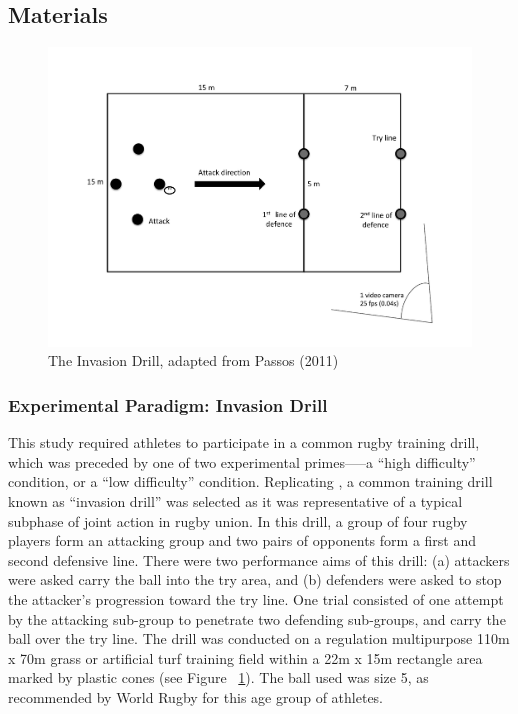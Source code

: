 \subsection{Materials}


\begin{figure}[htbp]
  \centering
      \includegraphics[width = \linewidth]{images/invasionDrill}
      \caption{The Invasion Drill, adapted from Passos (2011)}
      \label{fig:invasionDrill}
  \end{figure}


\subsubsection{Experimental Paradigm: Invasion Drill}
This study required athletes to participate in a common rugby training drill, which was preceded by one of two experimental primes—--a ``high difficulty'' condition, or a ``low difficulty'' condition.   Replicating \textcite{Passos2011}, a common training drill known as ``invasion drill'' \citep{Biscombe1998} was selected as it was representative of a typical subphase of joint action in rugby union.
In this drill, a group of four rugby players form an attacking group and two pairs of opponents form a first and second defensive line.  There were two performance aims of this drill: (a) attackers were asked carry the ball into the try area, and (b) defenders were asked to stop the attacker’s progression toward the try line.
One trial consisted of one attempt by the attacking sub-group to penetrate two defending sub-groups, and carry the ball over the try line. The drill was conducted on a regulation multipurpose 110m x 70m grass or artificial turf training field within a 22m x 15m rectangle area marked by plastic cones (see Figure ~\ref{fig:invasionDrill}). The ball used was size 5, as recommended by World Rugby for this age group of athletes.


